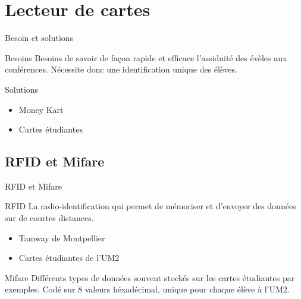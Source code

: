 \section{Lecteur de cartes}
\begin{frame}{Besoin et solutions}
	\begin{block}{Besoins}
        Besoins de savoir de façon rapide et efficace l'assiduité des évèles aux 
        conférences. Nécessite donc une identification unique des élèves.
	\end{block}

	\begin{block}{Solutions}
	    \begin{itemize}
            \item Money Kart
            \item Cartes étudiantes
	    \end{itemize}
	\end{block}
\end{frame}


\subsection{RFID et Mifare}
\begin{frame}{RFID et Mifare}
	\begin{block}{RFID}
        La radio-identification qui permet de mémoriser et d'envoyer des données sur
        de courtes distances.

	    \begin{itemize}
            \item Tamway de Montpellier
            \item Cartes étudiantes de l'UM2
	    \end{itemize}
	\end{block}

	\begin{block}{Mifare}
        Différents types de données souvent stockés sur les cartes étudiantes par
        exemples. Codé sur 8 valeurs héxadécimal, unique pour chaque élève à l'UM2.
	\end{block}
\end{frame}


